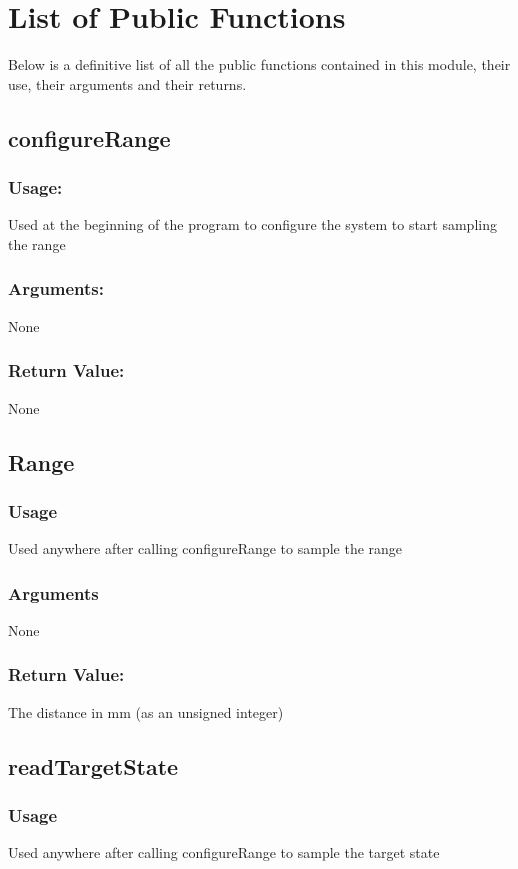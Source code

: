 \documentclass[]{report}
\begin{document}
\section{List of Public Functions}
Below is a definitive list of all the public functions contained in this module, their use, their arguments and their returns.

\subsection{configureRange}
\subsubsection{Usage:}
Used at the beginning of the program to configure the system to start sampling the range

\subsubsection{Arguments:}
None

\subsubsection{Return Value:}
None

\subsection{Range}
\subsubsection{Usage}
Used anywhere after calling configureRange to sample the range

\subsubsection{Arguments}
None

\subsubsection{Return Value:}
The distance in mm (as an unsigned integer)

\subsection{readTargetState}
\subsubsection{Usage}
Used anywhere after calling configureRange to sample the target state
\end{document}
